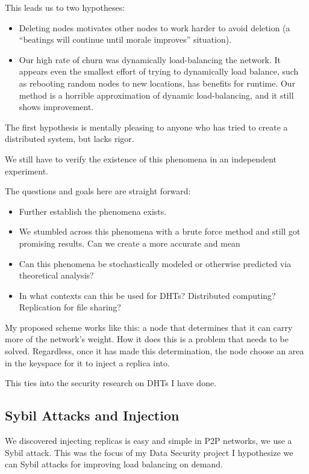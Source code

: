 This leads us to two hypotheses:
\begin{itemize}
	\item Deleting nodes motivates other nodes to work harder to avoid deletion (a ``beatings will continue until morale improves'' situation).
	\item Our high rate of churn was dynamically load-balancing the network.
	It appears even the smallest effort of trying to dynamically load balance, such as rebooting random nodes to new locations, has benefits for runtime.
	Our method is a horrible approximation of dynamic load-balancing, and it still shows improvement.
\end{itemize}

The first hypothesis is mentally pleasing to anyone who has tried to create a distributed system, but lacks rigor.


We still have to verify the existence of this phenomena in an independent experiment.


The questions and goals here are straight forward:
\begin{itemize}
	\item Further establish the phenomena exists.
	\item We stumbled across this phenomena with a brute force method and still got promising results.  
	Can we create a more accurate and mean
	\item Can this phenomena be stochastically modeled or otherwise predicted via theoretical analysis?
	\item In what contexts can this be used for DHTs?  Distributed computing?  Replication for file sharing?

\end{itemize}



My proposed scheme works like this: a node that determines that it can carry more of the network's weight.
How it does this is a problem that needs to be solved.
Regardless, once it has made this determination, the node choose an area in the keyspace for it to inject a replica into.

This ties into the security research on DHTs I have done.



\subsection{Sybil Attacks and Injection}
We discovered injecting replicas is easy and simple in P2P networks, we use a Sybil attack.
This was the focus of my Data Security project
I hypothesize we can Sybil attacks for improving load balancing on demand.


